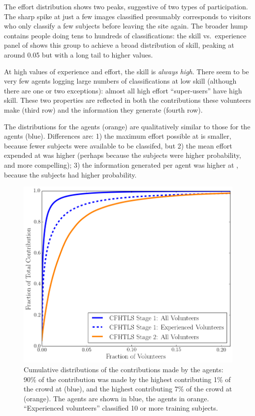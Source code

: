 \documentclass[useAMS,usenatbib,a4paper]{mn2e}
\begin{document}
The effort distribution shows two peaks, suggestive of two types of
participation.  The sharp spike at just a few images classified presumably
corresponds to visitors who only classify a few subjects before leaving the site
again. The broader hump contains people doing tens to hundreds of
classifications: the skill vs.\ experience panel of 
shows this group to achieve a broad distribution of  skill, peaking at around
0.05 but with a long tail to higher values.

At high values of experience and effort, the skill is \emph{always high}. There
seem to be very few agents logging large numbers of classifications at low skill
(although there are one or two exceptions): almost all high effort
``super-users'' have high skill. These two properties are reflected in both the
contributions these volunteers make (third row) and the information they
generate (fourth row).

The distributions for the \StageTwo agents (orange) are qualitatively similar to
those for the \StageOne agents (blue). Differences are: 1) the maximum effort
possible at \StageTwo is smaller, because fewer subjects were available to be
classifed, but 2) the mean effort expended at \StageTwo was higher (perhaps
because the subjects were higher probability, and more compelling); 3) the
information generated per agent was higher at \StageTwo, because the subjects
had higher probability.

\begin{figure}
\centering\includegraphics[width=0.9\linewidth]{sw-system-figs/crowd_contrib_cumul.png}
\caption{Cumulative distributions of the contributions made by the agents: 90\%
of the contribution was made by the highest contributing 1\% of the crowd at
\StageOne (blue), and the highest contributing  7\% of the crowd at \StageTwo
(orange). The \StageOne agents are shown in blue, the \StageTwo agents in
orange. ``Experienced volunteers'' classified 10 or more training subjects.}
\label{fig:crowd:cumulplot}
\end{figure}
\end{document}
